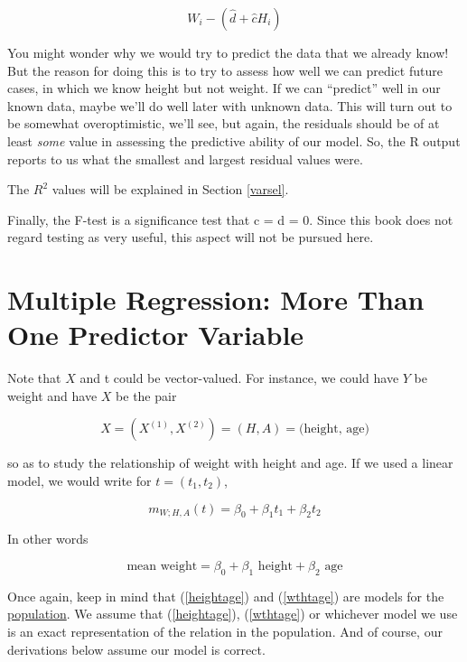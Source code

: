 \begin{equation}
W_i - (\hat{d} + \hat{c} H_i)
\end{equation}

You might wonder why we would try to predict the data that we already
know!  But the reason for doing this is to try to assess how well we can
predict future cases, in which we know height but not weight.  If we can
``predict'' well in our known data, maybe we'll do well later with
unknown data.  This will turn out to be somewhat overoptimistic, we'll
see, but again, the residuals should be of at least {\it some} value in
assessing the predictive ability of our model.  So, the R output reports
to us what the smallest and largest residual values were.

The $R^2$ values will be explained in Section \ref{varsel}.

Finally, the F-test is a significance test that c = d = 0.  Since this
book does not regard testing as very useful, this aspect will not be
pursued here.


\section{Multiple Regression:  More Than One Predictor Variable}

Note that $X$ and t could be vector-valued.  For instance, we could have
$Y$ be weight and have $X$ be the pair 

\begin{equation}
X = \left ( X^{(1)},X^{(2)} \right ) = (H,A) = \textrm{(height, age)} 
\end{equation}

so as to study the relationship of weight with height and age.  If we
used a linear model, we would write for $t = (t_1,t_2)$,

\begin{equation}
\label{heightage}
m_{W;H,A}(t) = \beta_0 + \beta_1 t_1 + \beta_2 t_2
\end{equation}

In other words

\begin{equation}
\label{wthtage}
\textrm{mean weight} = \beta_0 + \beta_1 \textrm{ height} + 
\beta_2 \textrm{ age}
\end{equation}

Once again, keep in mind that (\ref{heightage}) and (\ref{wthtage}) are
models for the \underline{population}.  We assume that
(\ref{heightage}), (\ref{wthtage}) or whichever model we use is an exact
representation of the relation in the population.  And of course, our
derivations below assume our model is correct.

